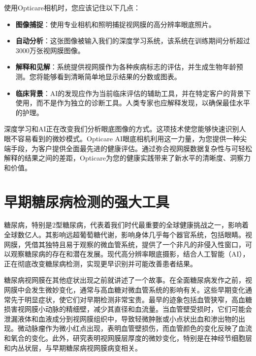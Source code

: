 \documentclass[
  Letterpaper,
]{scrbook}
\providecommand{\tightlist}{%
  \setlength{\itemsep}{0pt}\setlength{\parskip}{0pt}}\usepackage{longtable,booktabs,array}
\begin{document}
\begin{tcolorbox}[enhanced jigsaw, coltitle=black, rightrule=.15mm, colback=white, colbacktitle=quarto-callout-note-color!10!white, breakable, bottomtitle=1mm, opacityback=0, bottomrule=.15mm, titlerule=0mm, opacitybacktitle=0.6, left=2mm, colframe=quarto-callout-note-color-frame, title=\textcolor{quarto-callout-note-color}{\faInfo}\hspace{0.5em}{了解过程}, toptitle=1mm, toprule=.15mm, arc=.35mm, leftrule=.75mm]

使用Opticare相机时，您应该记住以下几点：

\begin{itemize}
\tightlist
\item
  \textbf{图像捕捉}：使用专业相机和照明捕捉视网膜的高分辨率眼底照片。
\item
  \textbf{自动分析}：这张图像被输入我们的深度学习系统，该系统在训练期间分析超过3000万张视网膜图像。
\item
  \textbf{解释和见解}：系统提供视网膜作为各种疾病标志的评估，并生成生物年龄预测。您将能够看到清晰简单地显示结果的分数或图表。
\item
  \textbf{临床背景}：AI的发现应作为当前临床评估的辅助工具，并在特定客户的背景下使用，而不是作为独立的诊断工具。人类专家也应解释发现，以确保最佳水平的护理。
\end{itemize}

\end{tcolorbox}

深度学习和AI正在改变我们分析眼底图像的方式。这项技术使您能够快速识别人眼不容易看到的微妙模式。Opticare
AI眼底相机利用这一力量，为您提供一种尖端手段，为客户提供全面最先进的健康评估。通过弥合视网膜数据复杂性与可轻松解释的结果之间的差距，Opticare为您的健康实践带来了新水平的清晰度、洞察力和价值。

\section{早期糖尿病检测的强大工具}\label{ux65e9ux671fux7cd6ux5c3fux75c5ux68c0ux6d4bux7684ux5f3aux5927ux5de5ux5177}

糖尿病，特别是2型糖尿病，代表着我们时代最重要的全球健康挑战之一，影响着全球数亿人。其影响远超葡萄糖代谢，影响身体几乎每个器官系统，包括眼睛。视网膜，凭借其独特且易于观察的微血管系统，提供了一个非凡的非侵入性窗口，可以观察糖尿病的存在和潜在发展。现代高分辨率眼底摄影，结合人工智能（AI），正在彻底改变糖尿病检测，实现更早识别并可能改善患者结果。

糖尿病视网膜在其他症状出现之前就讲述了一个故事。在全面糖尿病发作之前，视网膜中会发生微妙变化，通常与高血糖对微血管系统的影响有关。这些早期变化通常先于明显症状，使它们对早期检测非常宝贵。最早的迹象包括血管狭窄，高血糖损害视网膜小动脉的精细壁，减少其直径和血流量。当血管壁受损时，它们可能会泄漏液体和血液成分到视网膜组织中，导致轻微肿胀或小点状出血和渗出物的出现。微动脉瘤作为微小红点出现，表明血管壁损伤，而血管颜色的变化反映了血流和氧合的变化。此外，研究表明视网膜层厚度的微妙变化，特别是在神经节细胞层和内丛状层，与早期糖尿病视网膜病变相关。
\end{document}
